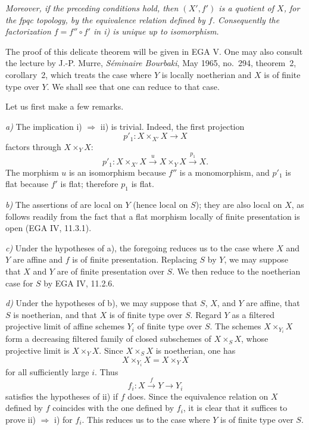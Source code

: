 \noindent\textit{Moreover, if the preceding conditions hold, then
\((X',f')\) is a quotient of \(X\), for the fpqc topology, by the
equivalence relation defined by \(f\). Consequently the
factorization \(f=f''\circ f'\) in i) is unique up to isomorphism.}

The proof of this delicate theorem will be given in EGA V. One may
also consult the lecture by J.-P. Murre, \textit{Séminaire
Bourbaki}, May 1965, no.~294, theorem~2, corollary~2, which treats
the case where \(Y\) is locally noetherian and \(X\) is of finite
type over \(Y\). We shall see that one can reduce to that case.

Let us first make a few remarks.

\medskip
\noindent\textit{a)} The implication i) \(\Rightarrow\) ii) is
trivial. Indeed, the first projection
\[
  p'_1:X\times_{X'}X\longrightarrow X
\]
factors through \(X\times_Y X\):
\[
  p'_1:X\times_{X'}X\xrightarrow{\,u\,}
  X\times_Y X\xrightarrow{\,p_1\,}X.
\]
The morphism \(u\) is an isomorphism because \(f''\) is a
monomorphism, and \(p'_1\) is flat because \(f'\) is flat; therefore
\(p_1\) is flat.

\medskip
\noindent\textit{b)} The assertions of  are local on \(Y\)
(hence local on \(S\)); they are also local on \(X\), as follows
readily from the fact that a flat morphism locally of finite
presentation is open (EGA IV, 11.3.1).

\medskip
\noindent\textit{c)} Under the hypotheses of  a), the foregoing
reduces us to the case where \(X\) and \(Y\) are affine and \(f\) is
of finite presentation. Replacing \(S\) by \(Y\), we may suppose
that \(X\) and \(Y\) are of finite presentation over \(S\). We then
reduce to the noetherian case for \(S\) by EGA IV, 11.2.6.

\medskip
\noindent\textit{d)} Under the hypotheses of  b), we may suppose
that \(S\), \(X\), and \(Y\) are affine, that \(S\) is noetherian,
and that \(X\) is of finite type over \(S\). Regard \(Y\) as a
filtered projective limit of affine schemes \(Y_i\) of finite type
over \(S\). The schemes \(X\times_{Y_i}X\) form a decreasing
filtered family of closed subschemes of \(X\times_S X\), whose
projective limit is \(X\times_Y X\). Since \(X\times_S X\) is
noetherian, one has
\[
  X\times_{Y_i}X=X\times_Y X
\]
for all sufficiently large \(i\). Thus
\[
  f_i:X\xrightarrow{\,f\,}Y\longrightarrow Y_i
\]
satisfies the hypotheses of  ii) if \(f\) does. Since the
equivalence relation on \(X\) defined by \(f\) coincides with the
one defined by \(f_i\), it is clear that it suffices to prove
ii) \(\Rightarrow\) i) for \(f_i\). This reduces us to the case
where \(Y\) is of finite type over \(S\).

